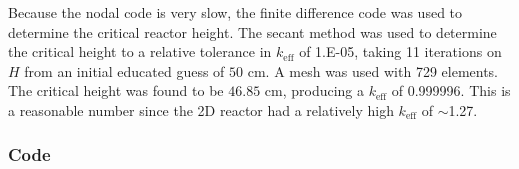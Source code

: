 \documentclass[12pt]{article}
\newcommand{\keff}{\ensuremath{k_{\mathrm{eff}}}}
\newenvironment{solnum}[2][Solution]{\begin{trivlist}
\item[\hskip \labelsep {\bfseries #1}\hskip \labelsep {\bfseries #2:}]\hspace{0.3in}\newline\newline}{\end{trivlist}}
\begin{document}
\clearpage

\begin{solnum}{1-3}

Because the nodal code is very slow, the finite difference code was used to determine
the critical reactor height. The secant method was used to determine the critical
height to a relative tolerance in $\keff$ of 1.E-05, taking 11 iterations on $H$
from an initial educated guess of $50$ cm.  A mesh was used with 729 elements. The
critical height was found to be  $46.85$ cm, producing a $\keff$ of 0.999996. This
is a reasonable number since the 2D reactor had a relatively high $\keff$ of
$\sim$1.27.
\end{solnum}

\clearpage

\clearpage
\subsubsection*{Code}
%
\end{document}
